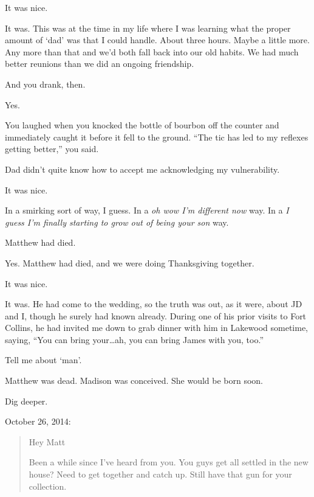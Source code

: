 \begin{paracol}{2}
\begin{leftcolumn}
\begin{ally}
It was nice.
\end{ally}
It was. This was at the time in my life where I was learning what the proper amount of `dad' was that I could handle. About three hours. Maybe a little more. Any more than that and we'd both fall back into our old habits. We had much better reunions than we did an ongoing friendship.

\begin{ally}
And you drank, then.
\end{ally}
Yes.

\begin{ally}
You laughed when you knocked the bottle of bourbon off the counter and immediately caught it before it fell to the ground. ``The tic has led to my reflexes getting better,'' you said.
\end{ally}
Dad didn't quite know how to accept me acknowledging my vulnerability.

\begin{ally}
It was nice.
\end{ally}
In a smirking sort of way, I guess. In a \emph{oh wow I'm different now} way. In a \emph{I guess I'm finally starting to grow out of being your son} way.

\begin{ally}
Matthew had died.
\end{ally}
Yes. Matthew had died, and we were doing Thanksgiving together.

\begin{ally}
It was nice.
\end{ally}
It was. He had come to the wedding, so the truth was out, as it were, about JD and I, though he surely had known already. During one of his prior visits to Fort Collins, he had invited me down to grab dinner with him in Lakewood sometime, saying, ``You can bring your\ldots{}ah, you can bring James with you, too.''

\begin{ally}
Tell me about `man'.
\end{ally}
Matthew was dead. Madison was conceived. She would be born soon.

\begin{ally}
Dig deeper.
\end{ally}
\newpage

October 26, 2014:

\begin{quotation}
Hey Matt

Been a while since I've heard from you. You guys get all settled in the new house? Need to get together and catch up. Still have that gun for your collection.


\end{quotation}
\end{leftcolumn}
\end{paracol}

